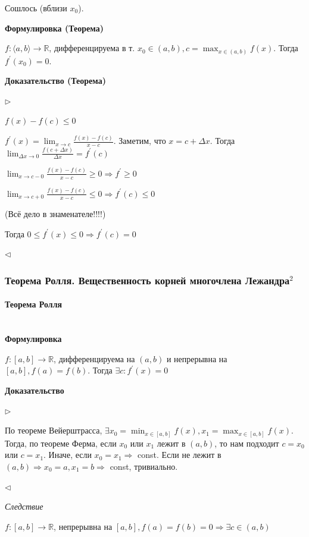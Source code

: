 \documentclass{article}
\let\vanillaparagraph\paragraph
\renewcommand{\paragraph}[1]{\vanillaparagraph{#1}\mbox{}\\}
\begin{document}
Сошлось (вблизи $x_0$).

\textbf{Формулировка (Теорема)}

$f: \langle a, b \rangle \rightarrow \mathbb{R}$, дифференцируема в т. $x_0 \in (a, b), c = \max_{x \in (a, b)} f(x)$. Тогда $f^\prime(x_0) = 0$.

\textbf{Доказательство (Теорема)}

$\rhd$

$f(x) - f(c) \le 0$

$f^\prime(x) = \lim_{x \rightarrow c}\frac{f(x) - f(c)}{x - c}$. Заметим, что $x = c + \Delta x$. Тогда $\lim_{\Delta x \rightarrow 0}{\frac{f(c + \Delta x)}{\Delta x}} = f^\prime(c)$

$\lim_{x \rightarrow c - 0}\frac{f(x) - f(c)}{x - c} \ge 0 \Rightarrow f^\prime \ge 0$

$\lim_{x \rightarrow c + 0}\frac{f(x) - f(c)}{x - c} \le 0 \Rightarrow f^\prime(c) \le 0$

(Всё дело в знаменателе!!!!)

Тогда $0 \le f^\prime(x) \le 0 \Rightarrow f^\prime(c) = 0$

$\lhd$

\subsubsection{Теорема Ролля. Вещественность корней многочлена Лежандра\texorpdfstring{$^2$}{}}

\paragraph{Теорема Ролля}
\textbf{Формулировка}

$f: [a, b] \rightarrow \mathbb{R}$, дифференцируема на $(a, b)$ и непрерывна на $[a, b], f(a) = f(b)$. Тогда $\exists c: f^\prime(x) = 0$

\textbf{Доказательство}

$\rhd$

По теореме Вейерштрасса, $\exists x_0 = \min_{x \in [a, b]}{f(x)}, x_1 = \max_{x \in [a, b]}{f(x)}$. Тогда, по теореме Ферма, если $x_0$ или $x_1$ лежит в $(a, b)$, то нам подходит $c = x_0$ или $c = x_1$. Иначе, если $x_0 = x_1 \Rightarrow$ const. Если не лежит в $(a, b) \Rightarrow x_0 = a, x_1 = b \Rightarrow$ const, тривиально.

$\lhd$

\textit{Следствие}

$f: [a, b] \rightarrow \mathbb{R}$, непрерывна на $[a, b], f(a) = f(b) = 0 \Rightarrow \exists c \in (a, b)$
\end{document}
